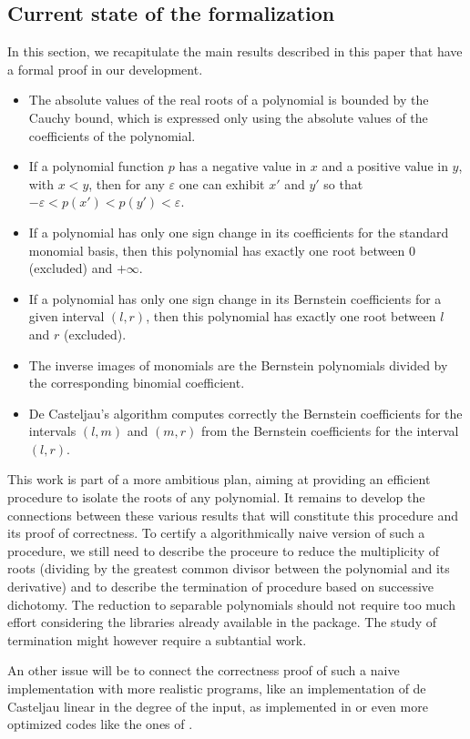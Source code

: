 \documentclass{mscs}
\begin{document}
\subsection{Current state of the formalization}
In this section, we recapitulate the main results described in this paper
that have a formal proof in our development.
\begin{itemize}
\item The absolute values of the real roots of a polynomial is bounded
  by the Cauchy bound, which is expressed only using the absolute
  values of the coefficients of the polynomial.
\item If a polynomial function \(p\)
has a negative value in \(x\) and a positive
value in \(y\), with \(x < y\), then for any \(\varepsilon\) one can
exhibit \(x'\) and \(y'\) so that \(-\varepsilon < p(x') < p(y') < \varepsilon\).
\item If a polynomial has only one sign change in its coefficients for the
standard monomial basis, then this polynomial has exactly one root between
\(0\) (excluded) and \(+\infty\).
\item If a polynomial has only one sign change in its Bernstein coefficients
for a given interval \((l,r)\), then this polynomial has exactly one root
between \(l\) and \(r\) (excluded).
\item The inverse images of monomials are the Bernstein polynomials divided
by the corresponding binomial coefficient.
\item De Casteljau's algorithm computes correctly the Bernstein coefficients
for the intervals \((l,m)\) and \((m,r)\) from the Bernstein coefficients
for the interval \((l,r)\).
\end{itemize}
This work is part of a more ambitious plan, aiming at providing an
efficient procedure
to isolate the roots of any polynomial.  It remains to develop the connections
between these various results that will constitute this procedure and its proof
of correctness. To certify a algorithmically naive version of such a
procedure, we still need to describe the proceure to reduce the
multiplicity of roots (dividing by the greatest common divisor
between the polynomial and its derivative) and to describe the termination
of procedure based on successive dichotomy. The reduction to separable
polynomials should not require too much effort considering the
libraries already available in the \ssr{} package. The study of
termination might however require a subtantial work.

An other issue will be to connect the correctness proof of such a
naive implementation with more realistic programs, like an
implementation of de Casteljau linear in the degree of the input, as
implemented in \cite{cadcoq} or even more optimized codes like the
ones of \cite{mourrainetal}.
\end{document}
